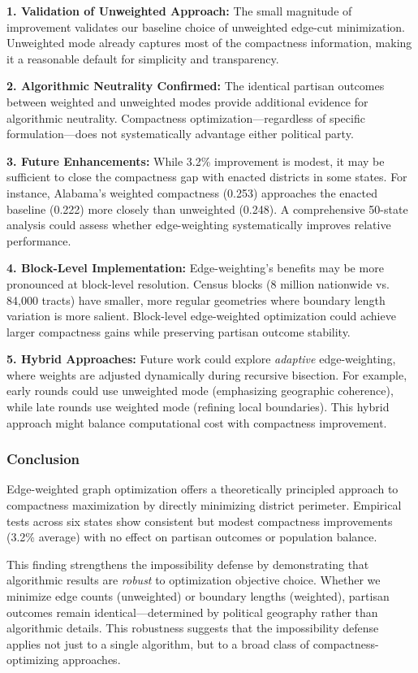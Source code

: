 \textbf{1. Validation of Unweighted Approach:} The small magnitude of improvement validates our baseline choice of unweighted edge-cut minimization. Unweighted mode already captures most of the compactness information, making it a reasonable default for simplicity and transparency.

\textbf{2. Algorithmic Neutrality Confirmed:} The identical partisan outcomes between weighted and unweighted modes provide additional evidence for algorithmic neutrality. Compactness optimization---regardless of specific formulation---does not systematically advantage either political party.

\textbf{3. Future Enhancements:} While 3.2\% improvement is modest, it may be sufficient to close the compactness gap with enacted districts in some states. For instance, Alabama's weighted compactness (0.253) approaches the enacted baseline (0.222) more closely than unweighted (0.248). A comprehensive 50-state analysis could assess whether edge-weighting systematically improves relative performance.

\textbf{4. Block-Level Implementation:} Edge-weighting's benefits may be more pronounced at block-level resolution. Census blocks (8 million nationwide vs. 84,000 tracts) have smaller, more regular geometries where boundary length variation is more salient. Block-level edge-weighted optimization could achieve larger compactness gains while preserving partisan outcome stability.

\textbf{5. Hybrid Approaches:} Future work could explore \textit{adaptive} edge-weighting, where weights are adjusted dynamically during recursive bisection. For example, early rounds could use unweighted mode (emphasizing geographic coherence), while late rounds use weighted mode (refining local boundaries). This hybrid approach might balance computational cost with compactness improvement.

\subsubsection{Conclusion}

Edge-weighted graph optimization offers a theoretically principled approach to compactness maximization by directly minimizing district perimeter. Empirical tests across six states show consistent but modest compactness improvements (3.2\% average) with no effect on partisan outcomes or population balance.

This finding strengthens the impossibility defense by demonstrating that algorithmic results are \textit{robust} to optimization objective choice. Whether we minimize edge counts (unweighted) or boundary lengths (weighted), partisan outcomes remain identical---determined by political geography rather than algorithmic details. This robustness suggests that the impossibility defense applies not just to a single algorithm, but to a broad class of compactness-optimizing approaches.

